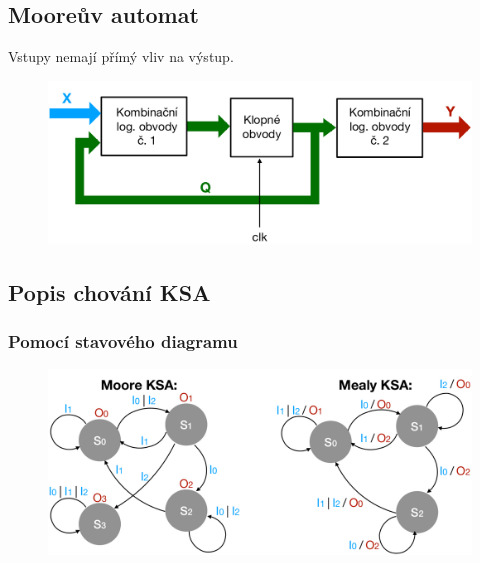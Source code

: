\subsection{Mooreův automat}
Vstupy nemají přímý vliv na výstup.
\begin{figure}[h!]
    \centering
    \includegraphics*[scale = 0.3]{img/Moore.png}
\end{figure}

\subsection{Popis chování KSA}
\subsubsection{Pomocí stavového diagramu}
\begin{figure}[h!]
    \centering
    \includegraphics[scale = 0.3]{img/Diagram.png}
\end{figure}

